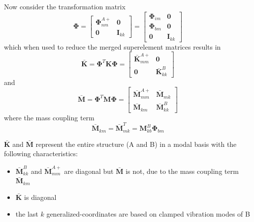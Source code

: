 \documentclass[11pt,openany,twoside]{book}
\numberwithin{equation}{section}		%
\newcommand{\Matrix}[1]{\boldsymbol{#1}}
\begin{document}
Now consider the transformation matrix
\begin{equation}
\Matrix{\Phi} = \left[
\begin{array}{cc}
   \Matrix{\Phi}_{nm}^{A+} & \Matrix{0} \\
   \Matrix{0} & \Matrix{I}_{kk}
\end{array}
\right] = \left[
\begin{array}{cc}
   \Matrix{\Phi}_{im} & \Matrix{0} \\
   \Matrix{\Phi}_{bm} & \Matrix{0} \\
   \Matrix{0} & \Matrix{I}_{kk}
\end{array}
\right]				\nonumber
\end{equation}
which when used to reduce the merged superelement matrices results in
\begin{equation}
\Matrix{\bar{K}} = \Matrix{\Phi}^T \Matrix{K} \Matrix{\Phi} = \left[
\begin{array}{cc}
   \Matrix{\bar{K}}_{mm}^{A+} & \Matrix{0} \\
   \Matrix{0} & \Matrix{\bar{K}}_{kk}^B
\end{array}
\right]			\nonumber
\end{equation}
and
\begin{displaymath}
\Matrix{\bar{M}} = \Matrix{\Phi}^T \Matrix{M} \Matrix{\Phi} = \left[
\begin{array}{cc}
   \Matrix{\bar{M}}_{mm}^{A+} & \Matrix{\bar{M}}_{mk} \\
   \Matrix{\bar{M}}_{km} & \Matrix{\bar{M}}_{kk}^B
\end{array}
\right]
\end{displaymath}
where the mass coupling term
\begin{displaymath}
\Matrix{\bar{M}}_{km} = \Matrix{\bar{M}}_{mk}^T = \Matrix{M}_{kb}^B \Matrix{\Phi}_{bm}
\end{displaymath}

$\Matrix{\bar{K}}$ and $\Matrix{\bar{M}}$ represent the entire structure
(A and B) in a modal basis with the following characteristics:
\begin{itemize}
\item $\Matrix{\bar{M}}_{kk}^B$ and $\Matrix{\bar{M}}_{mm}^{A+}$ are diagonal but
		$\Matrix{\bar{M}}$ is not, due to the mass coupling term $\Matrix{\bar{M}}_{km}$
\item $\Matrix{\bar{K}}$ is diagonal
\item the last $k$ generalized-coordinates are based on clamped vibration modes of B
\end{itemize}
\end{document}
